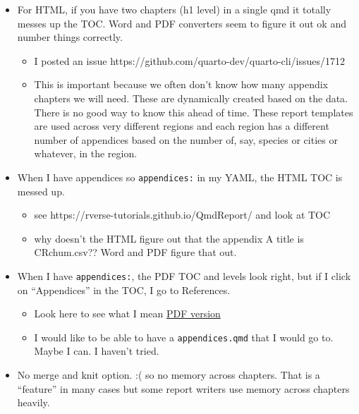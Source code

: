 \documentclass[
  letterpaper,
  oneside]{scrbook}
\providecommand{\tightlist}{%
  \setlength{\itemsep}{0pt}\setlength{\parskip}{0pt}}\usepackage{longtable,booktabs,array}
\begin{document}
\begin{itemize}
\tightlist
\item
  For HTML, if you have two chapters (h1 level) in a single qmd it
  totally messes up the TOC. Word and PDF converters seem to figure it
  out ok and number things correctly.

  \begin{itemize}
  \tightlist
  \item
    I posted an issue
    https://github.com/quarto-dev/quarto-cli/issues/1712
  \item
    This is important because we often don't know how many appendix
    chapters we will need. These are dynamically created based on the
    data. There is no good way to know this ahead of time. These report
    templates are used across very different regions and each region has
    a different number of appendices based on the number of, say,
    species or cities or whatever, in the region.
  \end{itemize}
\item
  When I have appendices so \texttt{appendices:} in my YAML, the HTML
  TOC is messed up.

  \begin{itemize}
  \tightlist
  \item
    see https://rverse-tutorials.github.io/QmdReport/ and look at TOC
  \item
    why doesn't the HTML figure out that the appendix A title is
    CRchum.csv?? Word and PDF figure that out.
  \end{itemize}
\item
  When I have \texttt{appendices:}, the PDF TOC and levels look right,
  but if I click on ``Appendices'' in the TOC, I go to References.

  \begin{itemize}
  \tightlist
  \item
    Look here to see what I mean
    \href{https://rverse-tutorials.github.io/QmdReport/A-Quarto-Template-Repo-to-Create-Big-Reports-and-Very-Long-Title-Because-Long-Titles-are-Common.pdf}{PDF
    version}
  \item
    I would like to be able to have a \texttt{appendices.qmd} that I
    would go to. Maybe I can. I haven't tried.
  \end{itemize}
\item
  No merge and knit option. :( so no memory across chapters. That is a
  ``feature'' in many cases but some report writers use memory across
  chapters heavily.
\end{itemize}
\end{document}
